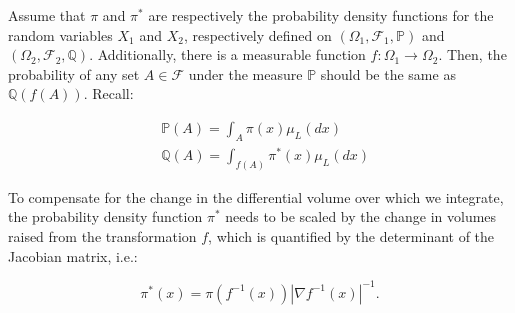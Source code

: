 \documentclass{article}
\begin{document}
Assume that $\pi$ and $\pi^*$ are respectively the probability density functions for the random variables $X_1$ and $X_2$, respectively defined on $(\Omega_1,\mathcal{F}_1,\mathbb{P})$ and $(\Omega_2,\mathcal{F}_2,\mathbb{Q})$. Additionally, there is a measurable function $f:\Omega_1\rightarrow\Omega_2$. Then, the probability of any set $A\in\mathcal{F}$ under the measure $\mathbb{P}$ should be the same as $\mathbb{Q}(f(A))$. Recall:

\begin{equation*}
\begin{aligned}
&\mathbb{P}(A)=\int_A\pi(x)\mu_L(dx)\\
&\mathbb{Q}(A)=\int_{f(A)}\pi^*(x)\mu_L(dx)
\end{aligned}
\end{equation*}

To compensate for the change in the differential volume over which we integrate, the probability density function $\pi^*$ needs to be scaled by the change in volumes raised from the transformation $f$, which is quantified by the determinant of the Jacobian matrix, i.e.:

\begin{equation*}
\pi^*(x)=\pi(f^{-1}(x))|\nabla f^{-1}(x)|^{-1}.
\end{equation*}
\end{document}
